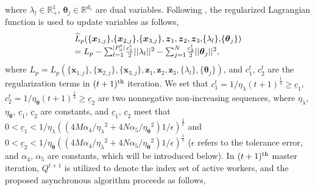 \documentclass[letterpaper]{article}
\begin{document}
where $\lambda _l\!\in\!\mathbb{R}^1_{+}$, $\boldsymbol{\theta}_j\!\in\!\mathbb{R}^{d_1}$ are dual variables. Following \cite{xu2020unified,jiao2022asynchronous}, the regularized Lagrangian function is used to update variables as follows,
\begin{equation}
\begin{array}{l}
\widehat{L}_p(\{{\boldsymbol{x}_{1,j}}\} ,\!\{{\boldsymbol{x}_{2,j}}\} ,\!\{{\boldsymbol{x}_{3,j}}\} ,{\boldsymbol{z}_1},{\boldsymbol{z}_2},{\boldsymbol{z}_3},\! \{\lambda_l\}, \!\{\boldsymbol{\theta}_j\} ) \\ = {L_p} - \sum\nolimits_{l = 1}^{|P_{{\rm{\uppercase\expandafter{\romannumeral2}}}}^{t}|} \!\frac{c_1^t}{2}||\lambda_l||^2 - \sum\nolimits_{j = 1}^{N}\! \frac{c_2^t}{2}||\boldsymbol{\theta}_j||^2,
\end{array}
\end{equation}
where $L_p\!=\!L_p(\{{\boldsymbol{x}_{1,j}}\} ,\!\{{\boldsymbol{x}_{2,j}}\} ,\!\{{\boldsymbol{x}_{3,j}}\} ,\!{\boldsymbol{z}_1},\!{\boldsymbol{z}_2},\!{\boldsymbol{z}_3},\! \{\lambda_l\}, \!\{\boldsymbol{\theta}_j\} )$, and $c_1^t$, $c_2^t$ are the regularization terms in $(t+1)^{\rm{th}}$ iteration. We set that ${c_1^t} =1/{{{\eta _{{\lambda}}}}{(t+1)^{\frac{1}{4}}}} \ge  \underline{c}_1$, ${c_2^t} = 1/{{{\eta _{{\boldsymbol{\theta }}}}}{(t+1)^{\frac{1}{4}}}}  \ge  \underline{c}_2$ are two nonnegative non-increasing sequences, where $\eta _{{\lambda}}$, $\eta _{{\boldsymbol{\theta }}}$, $\underline{c}_1$, $\underline{c}_2$ are constants, and $\underline{c}_1$, $\underline{c}_2$ meet that $0\!<\!\underline{c}_1\!<\!1/\eta _{{\lambda}}({({{4M\alpha_4}} / {{{{\eta _{\lambda}}}^2}} \!+\! {{4N\alpha_5}}/{{{{\eta _{\boldsymbol{\theta }}}}^2}})}1/\epsilon)^{\frac{1}{2}}$ and $0\!<\!\underline{c}_2\!<\!1/\eta _{{\boldsymbol{\theta }}} ({({{4M\alpha_4}} / {{{{\eta _{\lambda}}}^2}} \!+\! {{4N\alpha_5}}/{{{{\eta _{\boldsymbol{\theta }}}}^2}})}1/\epsilon)^{\frac{1}{2}}$ ($\epsilon$ refers to the tolerance error, and $\alpha_4$, $\alpha_5$ are constants, which will be introduced below). In $(t+1)^{\rm{th}}$ master iteration, $Q^{t+1} $ is utilized to denote the index set of active workers, and the proposed asynchronous algorithm proceeds as follows,
\end{document}
